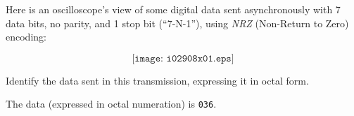 

Here is an oscilloscope's view of some digital data sent asynchronously with 7 data bits, no parity, and 1 stop bit (``7-N-1''), using {\it NRZ} (Non-Return to Zero) encoding:

$$\texttt{[image: i02908x01.eps]}$$

Identify the data sent in this transmission, expressing it in octal form.







The data (expressed in octal numeration) is {\tt 036}.











